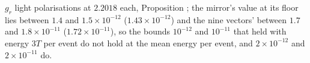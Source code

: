 $g_{r}$ light polarisations at $2.2018$ each, Proposition ; the mirror's value at its floor lies between $1.4$ and $1.5 \times 10^{-12}$ ($1.43 \times 10^{-12}$) and the nine vectors' between $1.7$ and $1.8 \times 10^{-11}$ ($1.72 \times 10^{-11}$), so the bounds $10^{-12}$ and $10^{-11}$ that held with energy $3T$ per event do not hold at the mean energy per event, and $2 \times 10^{-12}$ and $2 \times 10^{-11}$ do.
